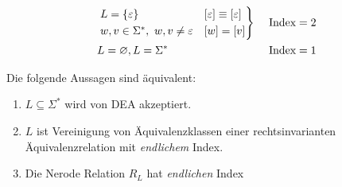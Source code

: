 \begin{alignat*}{2}
        &\begin{rcases}
        L=\{\varepsilon\} & [\varepsilon]\equiv[\varepsilon]\\
        w,v\in\Sigma^*,\ w,v\ne\varepsilon & [w]=[v]
        \end{rcases} &\ &\text{Index}= 2\\
        &L = \varnothing, L= \Sigma^* &&\text{Index}= 1
\end{alignat*}

\begin{Satz}[Nerode] %
        Die folgende Aussagen sind äquivalent:
        \begin{enumerate}
                \item\label{itm:Nerode1} $L\subseteq \Sigma^*$ wird von \ac{DEA} akzeptiert.
                \item\label{itm:Nerode2} $L$ ist Vereinigung von Äquivalenzklassen einer rechtsinvarianten Äquivalenzrelation mit \emph{endlichem} Index.
                \item\label{itm:Nerode3} Die Nerode Relation $R_L$ hat \emph{endlichen} Index
        \end{enumerate}
\end{Satz}

